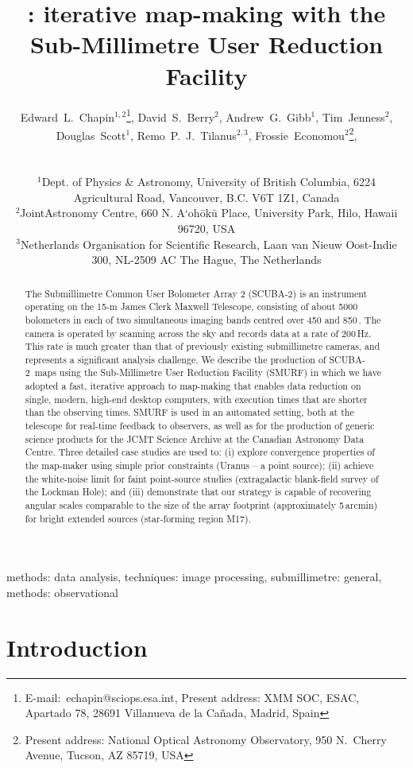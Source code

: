 \documentclass[useAMS,usenatbib,nofootinbib]{mn2e}
\title[\scuba: iterative map-making with SMURF]{\scuba: iterative map-making
with the Sub-Millimetre User Reduction Facility}
\author[Edward~L.~Chapin~et~al.]{
  \parbox[t]{\textwidth}{
    Edward~L.~Chapin$^{1,2}$\thanks{E-mail:~echapin@sciops.esa.int,
      Present address: XMM SOC, ESAC, Apartado 78, 28691 Villanueva de
      la Ca\~nada, Madrid, Spain},
    David~S.~Berry$^{2}$,
    Andrew~G.~Gibb$^{1}$,
    Tim~Jenness$^{2}$,
    Douglas~Scott$^{1}$,
    Remo~P.~J.~Tilanus$^{2,3}$,
    Frossie~Economou$^2$\thanks{Present address: National Optical
      Astronomy Observatory, 950 N.\ Cherry Avenue, Tucson, AZ 85719, USA},
  }
  \\
  \\
  $^{1}$Dept. of Physics \& Astronomy, University of British Columbia,
  6224 Agricultural Road, Vancouver, B.C. V6T 1Z1, Canada\\
  $^{2}$JointAstronomy Centre, 660 N. A`oh\={o}k\={u} Place, University
  Park, Hilo, Hawaii 96720, USA\\
  $^{3}$Netherlands Organisation for Scientific Research,
  Laan van Nieuw Oost-Indie 300, NL-2509 AC The Hague, The Netherlands}
\newcommand{\scuba}{SCUBA-2}
\begin{document}
\label{firstpage}

\maketitle

\begin{abstract}
  The Submillimetre Common User Bolometer Array 2 (\scuba) is an
  instrument operating on the 15-m James Clerk Maxwell Telescope,
  consisting of about 5000 bolometers in each of two simultaneous
  imaging bands centred over 450 and 850\,\micron. The camera is
  operated by scanning across the sky and records data at a rate of
  200\,Hz. This rate is much greater than that of previously existing
  submillimetre cameras, and represents a significant analysis
  challenge. We describe the production of \scuba\ maps using the
  Sub-Millimetre User Reduction Facility (SMURF) in which we have
  adopted a fast, iterative approach to map-making that enables data
  reduction on single, modern, high-end desktop computers, with
  execution times that are shorter than the observing times.  SMURF is
  used in an automated setting, both at the telescope for real-time
  feedback to observers, as well as for the production of generic
  science products for the JCMT Science Archive at the Canadian
  Astronomy Data Centre. Three detailed case studies are used to: (i)
  explore convergence properties of the map-maker using simple prior
  constraints (Uranus -- a point source); (ii) achieve the white-noise
  limit for faint point-source studies (extragalactic blank-field
  survey of the Lockman Hole); and (iii) demonstrate that our strategy
  is capable of recovering angular scales comparable to the size of
  the array footprint (approximately 5\,arcmin) for bright extended
  sources (star-forming region M17).
\end{abstract}


\begin{keywords}
methods: data analysis, techniques: image processing, submillimetre:
general, methods: observational
\end{keywords}

\section{Introduction}
\label{sec:intro}
\end{document}
